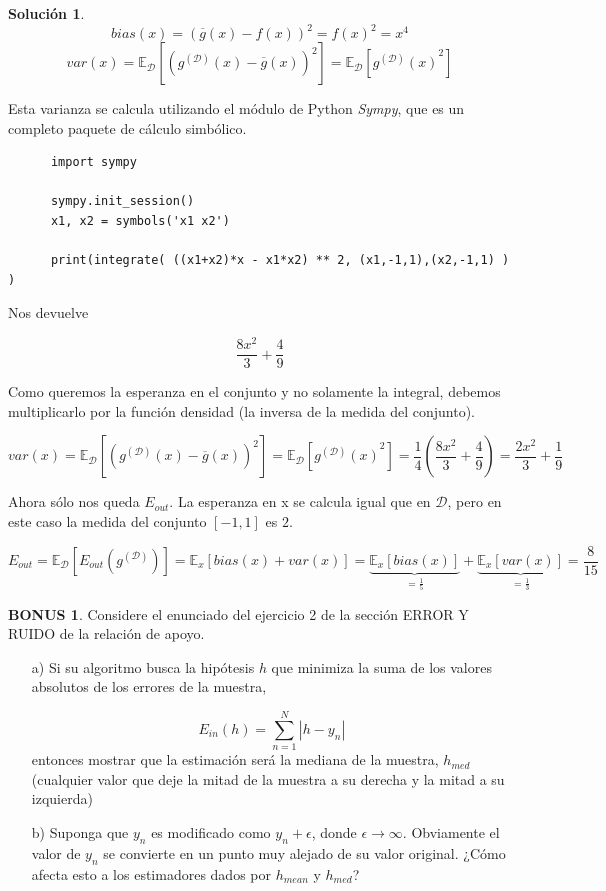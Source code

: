 \documentclass[a4paper, 11pt]{article}
\theoremstyle{definition}
\newtheorem*{solucion}{Solución}
\newtheorem*{bonus}{BONUS}
\begin{document}
\begin{solucion}
    $$ bias(x) = {(\overline{g}(x) - f(x))}^2 = f(x)^2 = x^4 $$
    $$ var(x) = \mathbb{E}_\mathcal{D}\left[ {(g^{(\mathcal{D})}(x) - \overline{g}(x) )}^2 \right] = \mathbb{E}_\mathcal{D}\left[ {g^{(\mathcal{D})}(x)}^2 \right] $$

    Esta varianza se calcula utilizando el módulo de Python \emph{Sympy}, que es un completo paquete de cálculo simbólico.

    \begin{lstlisting}
      import sympy

      sympy.init_session()
      x1, x2 = symbols('x1 x2')

      print(integrate( ((x1+x2)*x - x1*x2) ** 2, (x1,-1,1),(x2,-1,1) ) )
    \end{lstlisting}
    Nos devuelve

    $$ \frac{8 x^{2}}{3} + \frac{4}{9}$$

    Como queremos la esperanza en el conjunto y no solamente la integral, debemos multiplicarlo por la función densidad (la inversa de la medida del conjunto).

    $$var(x) = \mathbb{E}_\mathcal{D}\left[ {(g^{(\mathcal{D})}(x) - \overline{g}(x) )}^2 \right] = \mathbb{E}_\mathcal{D}\left[ {g^{(\mathcal{D})}(x)}^2 \right] = \frac{1}{4} \left(\frac{8 x^{2}}{3} + \frac{4}{9} \right) = \frac{2 x^{2}}{3} + \frac{1}{9}$$

    Ahora sólo nos queda $E_{out}$. La esperanza en x se calcula igual que en $\mathcal{D}$, pero en este caso la medida del conjunto $[-1,1]$ es $2$.

    $$ E_{out} = \mathbb{E}_\mathcal{D}\left[E_{out}(g^{(\mathcal{D})}) \right] = \mathbb{E}_x \left[ bias(x) + var(x)  \right] = \underbrace{\mathbb{E}_x \left[ bias(x) \right]}_{= \frac{1}{5}} + \underbrace{\mathbb{E}_x \left[ var(x)  \right]}_{=\frac{1}{3}} =  \frac{8}{15}$$

  \end{solucion}


  \begin{bonus}
    Considere el enunciado del ejercicio 2 de la sección ERROR Y RUIDO de la relación de apoyo.
    \begin{itemize}
      \item[a)] Si su algoritmo busca la hipótesis $h$ que minimiza la suma de los valores absolutos de los errores de la muestra,

      \[
      E_{in}(h) = \sum_{n=1}^N{|h-y_n|}
      \]
      entonces mostrar que la estimación será la mediana de la muestra, $h_{med}$ (cualquier valor que deje la mitad de la muestra a su derecha y la mitad a su izquierda)

      \item[b)] Suponga que $y_n$ es modificado como $y_n + \epsilon$, donde $\epsilon \rightarrow \infty$. Obviamente el valor de $y_n$ se convierte en un punto muy alejado de su valor original. ¿Cómo afecta esto a los estimadores dados por $h_{mean}$ y $h_{med}$?
    \end{itemize}
  \end{bonus}
\end{document}
